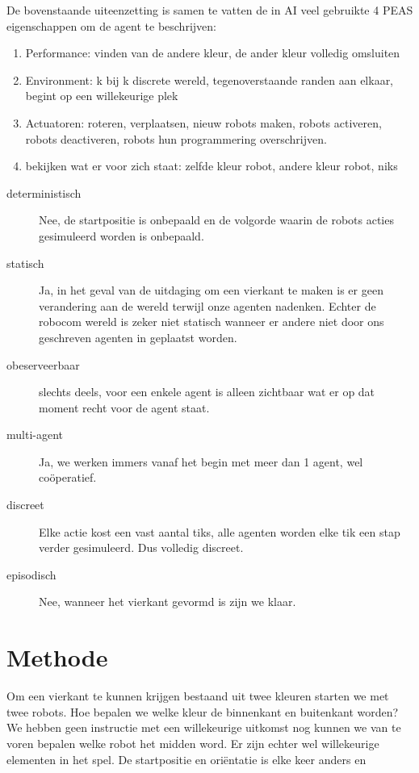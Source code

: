 \documentclass[10pt]{article}
\begin{document}
De bovenstaande uiteenzetting is samen te vatten de in AI veel gebruikte 4 PEAS eigenschappen om de agent te beschrijven: 

\begin{enumerate}
    \item Performance: vinden van de andere kleur, de ander kleur volledig omsluiten
    \item Environment: k bij k discrete wereld, tegenoverstaande randen aan elkaar, begint op een willekeurige plek
    \item Actuatoren: roteren, verplaatsen, nieuw robots maken, robots activeren, robots deactiveren, robots hun programmering overschrijven.
    \item bekijken wat er voor zich staat: zelfde kleur robot, andere kleur robot, niks
\end{enumerate}

\begin{description}
 \item[deterministisch] Nee, de startpositie is onbepaald en de volgorde waarin de robots acties gesimuleerd worden is onbepaald. 
 \item[statisch] Ja, in het geval van de uitdaging om een vierkant te maken is er geen verandering aan de wereld terwijl onze agenten nadenken. Echter de robocom wereld is zeker niet statisch wanneer er andere niet door ons geschreven agenten in geplaatst worden.
 \item[obeserveerbaar] slechts deels, voor een enkele agent is alleen zichtbaar wat er op dat moment recht voor de agent staat.

 \item[multi-agent] Ja, we werken immers vanaf het begin met meer dan 1 agent, wel coöperatief.
 \item[discreet] Elke actie kost een vast aantal tiks, alle agenten worden elke tik een stap verder gesimuleerd. Dus volledig discreet.
 \item[episodisch] Nee, wanneer het vierkant gevormd is zijn we klaar.
\end{description}


\section{Methode}

Om een vierkant te kunnen krijgen bestaand uit twee kleuren starten we met twee robots. Hoe bepalen we welke kleur de binnenkant en buitenkant worden? We hebben geen instructie met een willekeurige uitkomst nog kunnen we van te voren bepalen welke robot het midden word. Er zijn echter wel willekeurige elementen in het spel. De startpositie en oriëntatie is elke keer anders en
\end{document}
